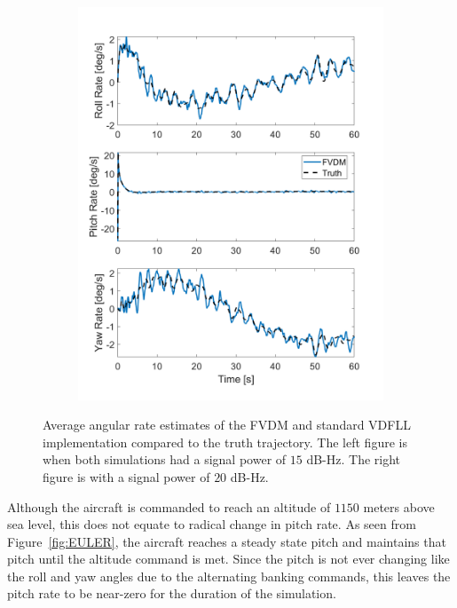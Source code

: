 \begin{figure}[!ht]
\begin{subfigure}{.45\textwidth}
        \includegraphics[width=1\linewidth]{Figures/dynamic/20/ANGULARRATES.png}
    \end{subfigure}
    \caption{Average angular rate estimates of the FVDM and standard VDFLL implementation compared to the truth trajectory. The left figure is when both simulations had a signal power of \(15\) dB-Hz. The right figure is with a signal power of \(20\) dB-Hz.}\label{fig:ANGRATES}
\end{figure}

Although the aircraft is commanded to reach an altitude of \(1150\) meters above sea level, this does not equate to radical change in pitch rate. As seen from Figure~\ref{fig:EULER}, the aircraft reaches a steady state pitch and maintains that pitch until the altitude command is met. Since the pitch is not ever changing like the roll and yaw angles due to the alternating banking commands, this leaves the pitch rate to be near-zero for the duration of the simulation.

